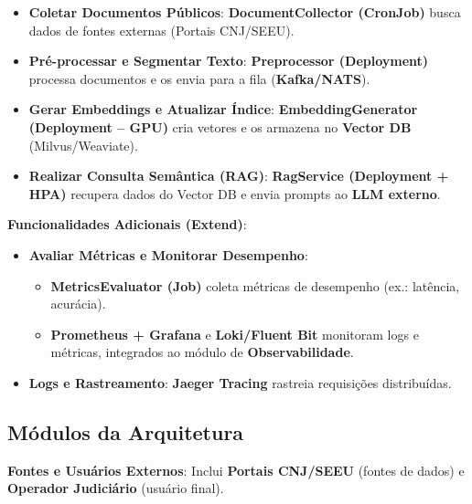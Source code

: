     \begin{itemize}
        \item \textbf{Coletar Documentos Públicos}:
\textbf{DocumentCollector (CronJob)} busca dados de fontes externas (Portais CNJ/SEEU).

        \item \textbf{Pré-processar e Segmentar Texto}:
\textbf{Preprocessor (Deployment)} processa documentos e os envia para a fila (\textbf{Kafka/NATS}).

        \item \textbf{Gerar Embeddings e Atualizar Índice}:
\textbf{EmbeddingGenerator (Deployment – GPU)} cria vetores e os armazena no \textbf{Vector DB} (Milvus/Weaviate).

        \item \textbf{Realizar Consulta Semântica (RAG)}:
\textbf{RagService (Deployment + HPA)} recupera dados do Vector DB e envia prompts ao \textbf{LLM externo}.

    \end{itemize}

    \item \textbf{Funcionalidades Adicionais (Extend)}:
    \begin{itemize}
        \item \textbf{Avaliar Métricas e Monitorar Desempenho}:
        \begin{itemize}
            \item \textbf{MetricsEvaluator (Job)} coleta métricas de desempenho (ex.: latência, acurácia).
            \item \textbf{Prometheus + Grafana} e \textbf{Loki/Fluent Bit} monitoram logs e métricas, integrados ao módulo de \textbf{Observabilidade}.
        \end{itemize}
        \item \textbf{Logs e Rastreamento}:
\textbf{Jaeger Tracing} rastreia requisições distribuídas.

    \end{itemize}

\subsection{Módulos da Arquitetura}

\textbf{Fontes e Usuários Externos}:
Inclui \textbf{Portais CNJ/SEEU} (fontes de dados) e \textbf{Operador Judiciário} (usuário final).



